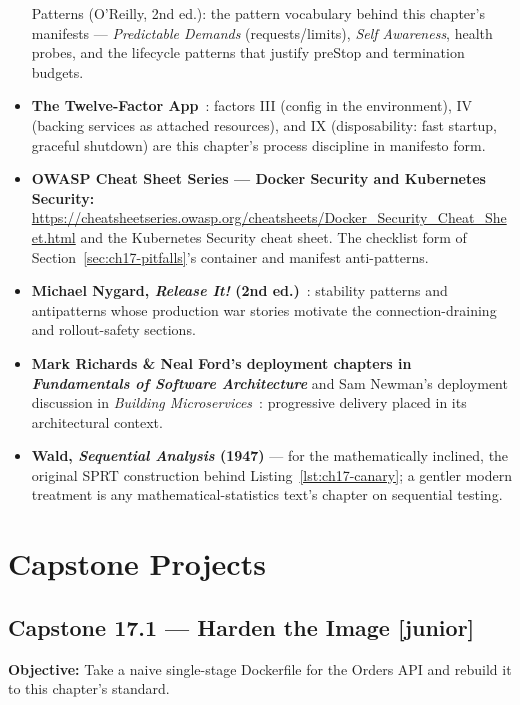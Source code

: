 \begin{itemize}
{{        Patterns} (O'Reilly, 2nd ed.):} the pattern vocabulary behind
        this chapter's manifests --- \emph{Predictable Demands}
        (requests/limits), \emph{Self Awareness}, health probes, and the
        lifecycle patterns that justify preStop and termination budgets.
  \item \textbf{The Twelve-Factor App}~\cite{twelvefactor}: factors III
        (config in the environment), IV (backing services as attached
        resources), and IX (disposability: fast startup, graceful
        shutdown) are this chapter's process discipline in manifesto
        form.
  \item \textbf{OWASP Cheat Sheet Series --- Docker Security and
        Kubernetes Security:}
        \url{https://cheatsheetseries.owasp.org/cheatsheets/Docker_Security_Cheat_Sheet.html}
        and the Kubernetes Security cheat sheet. The checklist form of
        Section~\ref{sec:ch17-pitfalls}'s container and manifest
        anti-patterns.
  \item \textbf{Michael Nygard, \emph{Release It!} (2nd
        ed.)}~\cite{nygard2018releaseit}: stability patterns and
        antipatterns whose production war stories motivate the
        connection-draining and rollout-safety sections.
  \item \textbf{Mark Richards \& Neal Ford's deployment chapters in
        \emph{Fundamentals of Software Architecture}} and Sam Newman's
        deployment discussion in \emph{Building
        Microservices}~\cite{newman2021microservices}: progressive
        delivery placed in its architectural context.
  \item \textbf{Wald, \emph{Sequential Analysis} (1947)} --- for the
        mathematically inclined, the original SPRT construction behind
        Listing~\ref{lst:ch17-canary}; a gentler modern treatment is any
        mathematical-statistics text's chapter on sequential testing.
\end{itemize}

\section{Capstone Projects}
\label{sec:ch17-capstones}

\subsection*{Capstone 17.1 --- Harden the Image \hfill [junior]}
\textbf{Objective:} Take a naive single-stage Dockerfile for the Orders
API and rebuild it to this chapter's standard.


